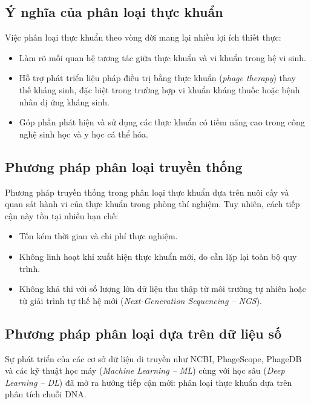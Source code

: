 \subsection{Ý nghĩa của phân loại thực khuẩn}

Việc phân loại thực khuẩn theo vòng đời mang lại nhiều lợi ích thiết thực:

\begin{itemize}
    \item Làm rõ mối quan hệ tương tác giữa thực khuẩn và vi khuẩn trong hệ vi sinh.
    \item Hỗ trợ phát triển liệu pháp điều trị bằng thực khuẩn (\textit{phage therapy}) thay thế kháng sinh, đặc biệt trong trường hợp vi khuẩn kháng thuốc hoặc bệnh nhân dị ứng kháng sinh.
    \item Góp phần phát hiện và sử dụng các thực khuẩn có tiềm năng cao trong công nghệ sinh học và y học cá thể hóa.
\end{itemize}

\subsection{Phương pháp phân loại truyền thống}

Phương pháp truyền thống trong phân loại thực khuẩn dựa trên nuôi cấy và quan sát hành vi của thực khuẩn trong phòng thí nghiệm. Tuy nhiên, cách tiếp cận này tồn tại nhiều hạn chế:

\begin{itemize}
    \item Tốn kém thời gian và chi phí thực nghiệm.
    \item Không linh hoạt khi xuất hiện thực khuẩn mới, do cần lặp lại toàn bộ quy trình.
    \item Không khả thi với số lượng lớn dữ liệu thu thập từ môi trường tự nhiên hoặc từ giải trình tự thế hệ mới (\textit{Next-Generation Sequencing – NGS}).
\end{itemize}

\subsection{Phương pháp phân loại dựa trên dữ liệu số}

Sự phát triển của các cơ sở dữ liệu di truyền như NCBI, PhageScope, PhageDB và các kỹ thuật học máy (\textit{Machine Learning – ML}) cùng với học sâu (\textit{Deep Learning – DL}) đã mở ra hướng tiếp cận mới: phân loại thực khuẩn dựa trên phân tích chuỗi DNA.

